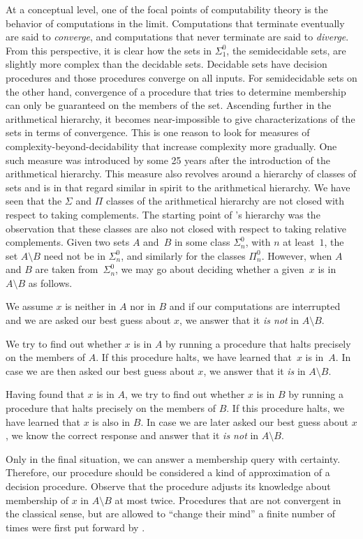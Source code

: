 At a conceptual level, one of the focal points of computability theory is the behavior of computations in the limit.
Computations that terminate eventually are said to \emph{converge}, and computations that never terminate are said to \emph{diverge}.
From this perspective, it is clear how the sets in $\Sigma^0_1$, the semidecidable sets, are slightly more complex than the decidable sets.
Decidable sets have decision procedures and those procedures converge on all inputs.
For semidecidable sets on the other hand, convergence of a procedure that tries to determine membership can only be guaranteed on the members of the set.
Ascending further in the arithmetical hierarchy, it becomes near-impossible to give characterizations of the sets in terms of convergence.
This is one reason to look for measures of complexity-beyond-decidability that increase complexity more gradually.
One such measure was introduced by \textcite{ershov1968hierarchyi} some 25 years after the introduction of the arithmetical hierarchy.
This measure also revolves around a hierarchy of classes of sets and is in that regard similar in spirit to the arithmetical hierarchy.
We have seen that the $\Sigma$ and $\Pi$ classes of the arithmetical hierarchy are not closed with respect to taking complements.
The starting point of \citeauthor{ershov1968hierarchyi}'s hierarchy was the observation that these classes are also not closed with respect to taking relative complements.
Given two sets $A$ and~$B$ in some class $\Sigma^0_n$, with $n$ at least~$1$, the set $A \setminus B$ need not be in $\Sigma^0_n$, and similarly for the classes $\Pi^0_n$.
However, when $A$ and $B$ are taken from~$\Sigma^0_n$, we may go about deciding whether a given~$x$ is in~$A \setminus B$ as follows.
\begin{codelisting}
\item
  We assume $x$ is neither in $A$ nor in $B$ and if our computations are interrupted and we are asked our best guess about $x$, we answer that it \emph{is not} in $A \setminus B$.
\item
  We try to find out whether $x$ is in $A$ by running a procedure that halts precisely on the members of $A$.
  If this procedure halts, we have learned that~$x$ is in~$A$.
  In case we are then asked our best guess about $x$, we answer that it \emph{is} in $A \setminus B$.
\item
  Having found that $x$ is in $A$, we try to find out whether $x$ is in $B$ by running a procedure that halts precisely on the members of $B$.
  If this procedure halts, we have learned that $x$ is also in $B$.
  In case we are later asked our best guess about $x$, we know the correct response and answer that it \emph{is not} in $A \setminus B$.
\end{codelisting}
Only in the final situation, we can answer a membership query with certainty.
Therefore, our procedure should be considered a kind of approximation of a decision procedure.
Observe that the procedure adjusts its knowledge about membership of $x$ in $A \setminus B$ at most twice.
Procedures that are not convergent in the classical sense, but are allowed to \enquote{change their mind} a finite number of times were first put forward by \textcite{putnam1965trial,gold1965limiting}.

